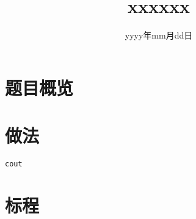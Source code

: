 \documentclass{ctsol}
\title{xxxxxx}
\date{yyyy年mm月dd日}
\begin{document}
\maketitle
{}

\section*{题目概览}
\solutiontab

\makesolution
\section*{做法}
\verb|cout|

\section*{标程}
\end{document}
